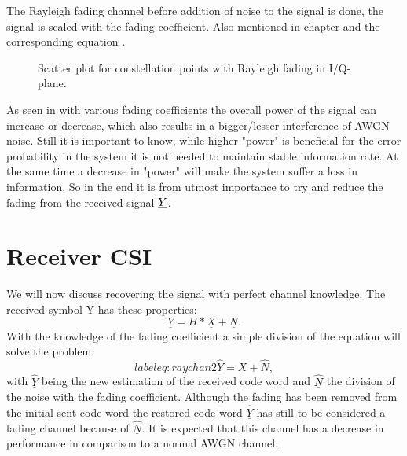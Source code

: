 The Rayleigh fading channel before addition of noise to the signal is done, the signal is scaled with the fading coefficient. Also mentioned in chapter  and the corresponding equation .
\begin{figure}[!htb]
	\setlength{}
	\setlength\fheight{0.4\textheight}
	\centering
		
	\caption{Scatter plot for constellation points with Rayleigh fading in I/Q-plane.}
	\label{fig:scatter}
\end{figure}
As seen in  with various fading coefficients the overall power of the signal can increase or decrease, which also results in a bigger/lesser interference of AWGN noise. Still it is important to know, while higher "power" is beneficial for the error probability in the system it is not needed to maintain stable information rate. At the same time a decrease in "power" will make the system suffer a loss in information. So in the end it is from utmost importance to try and reduce the fading from the received signal $\boldmath\underline{Y}$.
\clearpage
\section{Receiver CSI}
We will now discuss recovering the signal with perfect channel knowledge. The received symbol Y has these properties: 
\begin{equation}
\label{eq:raychan}
\underline{Y} = H * \underline{X} + \underline{N}.
\end{equation}
With the knowledge of the fading coefficient a simple division of the equation will solve the problem.
\begin{equation}
label{eq:raychan2}
\underline{\hat{Y}} = \underline{X} + \underline{\hat{N}},
\end{equation}
with $\underline{\hat{Y}}$ being the new estimation of the received code word and $\underline{\hat{N}}$ the division of the noise with the fading coefficient.
Although the fading has been removed from the initial sent code word the restored code word \textbf{$\underline{\hat{Y}}$} has still to be considered a fading channel because of $\underline{\hat{N}}$. It is expected that this channel has a decrease in performance in comparison to a normal AWGN channel.

